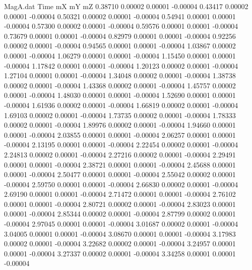 \begin{filecontents}{MagA.dat}
Time mX mY mZ
   0.38710    0.00002    0.00001   -0.00004
   0.43417    0.00002    0.00001   -0.00004
   0.50321    0.00002    0.00001   -0.00004
   0.54941    0.00001    0.00001   -0.00004
   0.57300    0.00002    0.00001   -0.00004
   0.59576    0.00001    0.00001   -0.00004
   0.73679    0.00001    0.00001   -0.00004
   0.82979    0.00001    0.00001   -0.00004
   0.92256    0.00002    0.00001   -0.00004
   0.94565    0.00001    0.00001   -0.00004
   1.03867    0.00002    0.00001   -0.00004
   1.06279    0.00001    0.00001   -0.00004
   1.15450    0.00001    0.00001   -0.00004
   1.17842    0.00001    0.00001   -0.00004
   1.20123    0.00002    0.00001   -0.00004
   1.27104    0.00001    0.00001   -0.00004
   1.34048    0.00002    0.00001   -0.00004
   1.38738    0.00002    0.00001   -0.00004
   1.43368    0.00002    0.00001   -0.00004
   1.45757    0.00002    0.00001   -0.00004
   1.48030    0.00001    0.00001   -0.00004
   1.52690    0.00001    0.00001   -0.00004
   1.61936    0.00002    0.00001   -0.00004
   1.66819    0.00002    0.00001   -0.00004
   1.69103    0.00002    0.00001   -0.00004
   1.73735    0.00002    0.00001   -0.00004
   1.78333    0.00002    0.00001   -0.00004
   1.89976    0.00002    0.00001   -0.00004
   1.94660    0.00001    0.00001   -0.00004
   2.03855    0.00001    0.00001   -0.00004
   2.06257    0.00001    0.00001   -0.00004
   2.13195    0.00001    0.00001   -0.00004
   2.22454    0.00002    0.00001   -0.00004
   2.24813    0.00002    0.00001   -0.00004
   2.27216    0.00002    0.00001   -0.00004
   2.29491    0.00001    0.00001   -0.00004
   2.38721    0.00001    0.00001   -0.00004
   2.45688    0.00001    0.00001   -0.00004
   2.50477    0.00001    0.00001   -0.00004
   2.55042    0.00002    0.00001   -0.00004
   2.59750    0.00001    0.00001   -0.00004
   2.66830    0.00002    0.00001   -0.00004
   2.69190    0.00001    0.00001   -0.00004
   2.71472    0.00001    0.00001   -0.00004
   2.76102    0.00001    0.00001   -0.00004
   2.80721    0.00002    0.00001   -0.00004
   2.83023    0.00001    0.00001   -0.00004
   2.85344    0.00002    0.00001   -0.00004
   2.87799    0.00002    0.00001   -0.00004
   2.97045    0.00001    0.00001   -0.00004
   3.01687    0.00002    0.00001   -0.00004
   3.04005    0.00001    0.00001   -0.00004
   3.08670    0.00001    0.00001   -0.00004
   3.17983    0.00002    0.00001   -0.00004
   3.22682    0.00002    0.00001   -0.00004
   3.24957    0.00001    0.00001   -0.00004
   3.27337    0.00002    0.00001   -0.00004
   3.34258    0.00001    0.00001   -0.00004

\end{filecontents}
